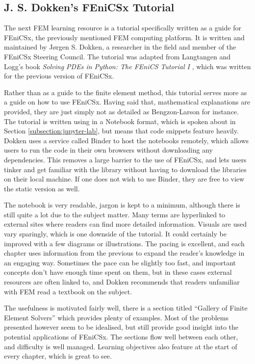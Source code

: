 \subsection{J. S. Dokken's FEniCSx Tutorial} \label{subsection:dokken-fenics}

The next FEM learning resource is a tutorial specifically written as a guide for FEniCSx, the previously mentioned FEM computing platform. It is written and maintained by Jørgen S. Dokken, a researcher in the field and member of the FEniCSx Steering Council. The tutorial was adapted from Langtangen and Logg's book \textit{Solving PDEs in Python: The FEniCS Tutorial I} \cite{langtangen-logg}, which was written for the previous version of FEniCSx.

Rather than as a guide to the finite element method, this tutorial serves more as a guide on how to use FEniCSx. Having said that, mathematical explanations are provided, they are just simply not as detailed as Bengzon-Larson for instance. The tutorial is written using in a Notebook format, which is spoken about in Section \ref{subsection:jupyter-lab}, but means that code snippets feature heavily. Dokken uses a service called Binder to host the notebooks remotely, which allows users to run the code in their own browsers without downloading any dependencies. This removes a large barrier to the use of FEniCSx, and lets users tinker and get familiar with the library without having to download the libraries on their local machine. If one does not wish to use Binder, they are free to view the static version as well.

The notebook is very readable, jargon is kept to a minimum, although there is still quite a lot due to the subject matter. Many terms are hyperlinked to external sites where readers can find more detailed information. Visuals are used vary sparingly, which is one downside of the tutorial. It could certainly be improved with a few diagrams or illustrations. The pacing is excellent, and each chapter uses information from the previous to expand the reader's knowledge in an engaging way. Sometimes the pace can be slightly too fast, and important concepts don't have enough time spent on them, but in these cases external resources are often linked to, and Dokken recommends that readers unfamiliar with FEM read a textbook on the subject.

The usefulness is motivated fairly well, there is a section titled ``Gallery of Finite Element Solvers'' which provides plenty of examples. Most of the problems presented however seem to be idealised, but still provide good insight into the potential applications of FEniCSx. The sections flow well between each other, and difficulty is well managed. Learning objectives also feature at the start of every chapter, which is great to see.

